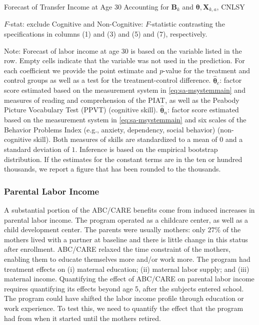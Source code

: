 \begin{table}
\begin{threeparttable}
\caption{Forecast of Transfer Income at Age 30 Accounting for $\bm{B}_k$ and $\bm{\theta}, \bm{X}_{k,a}$, CNLSY} \label{table:trincome}
\centering
\footnotesize

\begin{tablenotes}
\footnotesize
\item $F$-stat: exclude Cognitive and Non-Cognitive: $F$-statistic contrasting the specifications in columns (1) and (3) and (5) and (7), respectively.\\
\item Note: Forecast of labor income at age 30 is based on the variable listed in the row. Empty cells indicate that the variable was not used in the prediction. For each coefficient we provide the point estimate and $p$-value for the treatment and control groups as well as a test for the treatment-control difference. $\hat{\bm{\theta}}_{c}$: factor score estimated based on the measurement system in \eqref{eq:sa-msystemmain} and measures of reading and comprehension of the PIAT, as well as the Peabody Picture Vocabulary Test (PPVT) (cognitive skill). $\hat{\bm{\theta}}_{n}$: factor score estimated based on the measurement system in \eqref{eq:sa-msystemmain} and six scales of the Behavior Problems Index (e.g., anxiety, dependency, social behavior) (non-cognitive skill).  Both measures of skills are standardized to a mean of $0$ and a standard deviation of $1$. Inference is based on the empirical bootstrap distribution. If the estimates for the constant terms are in the ten or hundred thousands, we report a figure that has been rounded to the thousands.
\end{tablenotes}
\end{threeparttable}
\end{table}

\subsubsection{Parental Labor Income}\label{app:parentalincome}

\noindent A substantial portion of the ABC/CARE benefits come from induced increases in parental labor income. The program operated as a childcare center, as well as a child development center. The parents were usually mothers: only $27\%$ of the mothers lived with a partner at baseline and there is little change in this status after enrollment. ABC/CARE relaxed the time constraint of the mothers, enabling them to educate themselves more and/or work more. The program had treatment effects on (i) maternal education; (ii) maternal labor supply; and (iii) maternal income. Quantifying the effect of ABC/CARE on parental labor income requires quantifying its effects beyond age 5, after the subjects entered school. The program could have shifted the labor income profile through education or work experience. To test this, we need to quantify the effect that the program had from when it started until the mothers retired.

